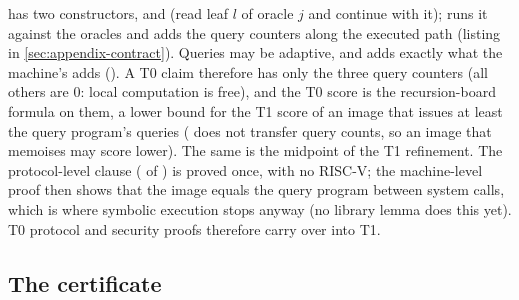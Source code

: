 \noindent {} has two constructors,  and  (read leaf $l$ of
oracle $j$ and continue with it);  runs it against the oracles and
 adds the query counters along the executed path (listing in
\cref{sec:appendix-contract}). Queries may be adaptive, and  adds exactly what the machine's
 adds (). A T0 claim therefore has only the three query
counters (all others are $0$: local computation is free), and the T0 score is the recursion-board
formula on them, a lower bound for the T1 score of an image that issues at least the query
program's queries ( does not transfer query counts, so an image that memoises may
score lower). The same  is the midpoint of the T1 refinement. The protocol-level clause
( of ) is proved once, with no RISC-V; the machine-level proof then
shows that the image equals the query program between system calls, which is where symbolic
execution stops anyway (no library lemma does this yet). T0 protocol and security proofs therefore
carry over into T1.

\subsection{The certificate}\label{subsec:proto-certificate}

